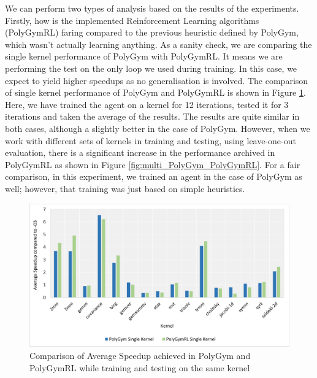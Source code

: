 \documentclass[logo,msc]{infthesis}           %
\begin{document}
We can perform two types of analysis based on the results of the experiments. Firstly, how is the implemented Reinforcement Learning algorithms (PolyGymRL) faring compared to the previous heuristic defined by PolyGym, which wasn't actually learning anything. As a sanity check, we are comparing the single kernel performance of PolyGym with PolyGymRL. It means we are performing the test on the only loop we used during training. In this case, we expect to yield higher speedups as no generalisation is involved. The comparison of single kernel performance of PolyGym and PolyGymRL is shown in Figure \ref{fig:single_PolyGym_PolyGymRL}. Here, we have trained the agent on a kernel for 12 iterations, tested it for 3 iterations and taken the average of the results. The results are quite similar in both cases, although a slightly better in the case of PolyGym. However, when we work with different sets of kernels in training and testing, using leave-one-out evaluation, there is a significant increase in the performance archived in PolyGymRL as shown in Figure \ref{fig:multi_PolyGym_PolyGymRL}. For a fair comparison, in this experiment, we trained an agent in the case of PolyGym as well; however, that training was just based on simple heuristics.

\begin{figure}[htbp]
  \centering
  \includegraphics[width=\textwidth]{Images/Chart_Single_PolyGym_PolyGymRL.png}    
  \caption{Comparison of Average Speedup achieved in PolyGym and PolyGymRL while training and testing on the same kernel}
  \label{fig:single_PolyGym_PolyGymRL}
\end{figure}
\end{document}
